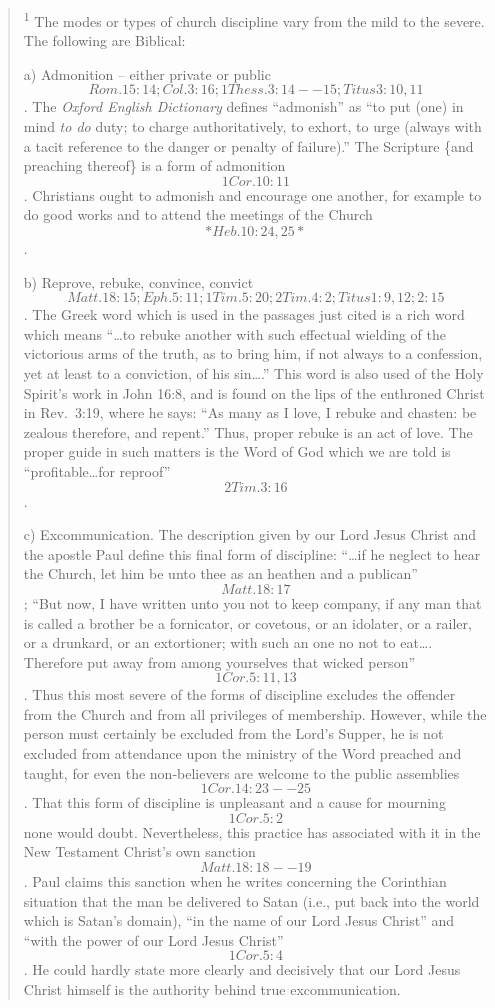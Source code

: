 \documentclass[
]{book}
\begin{document}
\begin{quote}
\textsuperscript{1} The modes or types of church discipline vary from the mild to the severe. The following are Biblical:

a) Admonition -- either private or public \[Rom. 15:14; Col. 3:16; 1 Thess. 3:14--15; Titus 3:10,11\]. The \emph{Oxford English Dictionary} defines ``admonish'' as ``to put (one) in mind \emph{to do} duty; to charge authoritatively, to exhort, to urge (always with a tacit reference to the danger or penalty of failure).'' The Scripture \{and preaching thereof\} is a form of admonition \[1 Cor. 10:11\]. Christians ought to admonish and encourage one another, for example to do good works and to attend the meetings of the Church \[*Heb. 10:24, 25*\].

b) Reprove, rebuke, convince, convict \[Matt. 18:15; Eph. 5:11; 1 Tim. 5:20; 2 Tim. 4:2; Titus 1:9, 12; 2:15\]. The Greek word which is used in the passages just cited is a rich word which means ``\ldots to rebuke another with such effectual wielding of the victorious arms of the truth, as to bring him, if not always to a confession, yet at least to a conviction, of his sin\ldots.'' This word is also used of the Holy Spirit's work in John 16:8, and is found on the lips of the enthroned Christ in Rev.~3:19, where he says: ``As many as I love, I rebuke and chasten: be zealous therefore, and repent.'' Thus, proper rebuke is an act of love. The proper guide in such matters is the Word of God which we are told is ``profitable\ldots for reproof'' \[2 Tim. 3:16\].

c) Excommunication. The description given by our Lord Jesus Christ and the apostle Paul define this final form of discipline: ``\ldots if he neglect to hear the Church, let him be unto thee as an heathen and a publican'' \[Matt. 18:17\]; ``But now, I have written unto you not to keep company, if any man that is called a brother be a fornicator, or covetous, or an idolater, or a railer, or a drunkard, or an extortioner; with such an one no not to eat\ldots. Therefore put away from among yourselves that wicked person'' \[1 Cor. 5:11,13\]. Thus this most severe of the forms of discipline excludes the offender from the Church and from all privileges of membership. However, while the person must certainly be excluded from the Lord's Supper, he is not excluded from attendance upon the ministry of the Word preached and taught, for even the non-believers are welcome to the public assemblies \[1 Cor. 14:23--25\]. That this form of discipline is unpleasant and a cause for mourning \[1 Cor. 5:2\] none would doubt. Nevertheless, this practice has associated with it in the New Testament Christ's own sanction \[Matt. 18:18--19\]. Paul claims this sanction when he writes concerning the Corinthian situation that the man be delivered to Satan (i.e., put back into the world which is Satan's domain), ``in the name of our Lord Jesus Christ'' and ``with the power of our Lord Jesus Christ'' \[1 Cor. 5:4\]. He could hardly state more clearly and decisively that our Lord Jesus Christ himself is the authority behind true excommunication.
\end{quote}
\end{document}
